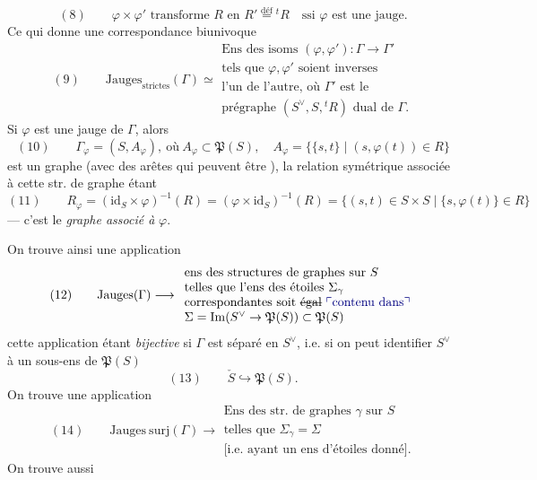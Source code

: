 \documentclass[11pt,a4paper]{article}
\begin{document}
\[
(8) \qquad \varphi \times \varphi' \text{ transforme } R \text{ en } R' \overset{\mathrm{déf}}{=} {}^{t}R \quad \text{ssi } \varphi \text{ est une jauge.}
\]
Ce qui donne une correspondance biunivoque
\[
(9) \qquad \mathrm{Jauges}_{\text{strictes}}(\Gamma) \simeq
\begin{array}{l}
\text{Ens des isoms } (\varphi, \varphi') : \Gamma \to \Gamma' \\
\text{tels que } \varphi, \varphi' \text{ soient inverses} \\
\text{l'un de l'autre, où } \Gamma' \text{ est le} \\
\text{prégraphe } (S^{\vee}, S, {}^{t}R) \text{ dual de } \Gamma .
\end{array}
\]
Si $\varphi$ est une jauge de $\Gamma$, alors
\[
(10) \qquad \Gamma_{\varphi} = (S, A_{\varphi}), \ \text{où}\ A_{\varphi} \subset \mathfrak{P}(S), \quad A_{\varphi} = \{\{s,t\} \mid (s, \varphi(t)) \in R\}
\]
est un graphe (avec des arêtes qui peuvent être ), la relation symétrique associée à cette str. de graphe étant
\[
(11) \qquad R_{\varphi} = (\mathrm{id}_S \times \varphi)^{-1}(R) = (\varphi \times \mathrm{id}_S)^{-1}(R) = \{(s,t) \in S \times S \mid \{s, \varphi(t)\} \in R\}
\]
--- c'est le \emph{graphe associé à} $\varphi$. 

On trouve ainsi une application
\[
(12) \qquad \mathrm{Jauges}(\Gamma) \longrightarrow
\begin{array}{l}
\text{ens des structures de graphes sur } S \\
\text{telles que l'ens des étoiles } \Sigma_{\gamma} \\
\text{correspondantes soit \struck{égal} \add{contenu dans}} \\
\Sigma = \mathrm{Im}(S^{\vee} \to \mathfrak{P}(S)) \subset \mathfrak{P}(S)
\end{array}
\]
cette application étant \emph{bijective} si $\Gamma$ est séparé en $S^{\vee}$, i.e. si on peut identifier $S^{\vee}$ à un sous-ens de $\mathfrak{P}(S)$
\[
(13) \qquad \check{S} \hookrightarrow \mathfrak{P}(S) .
\]
On trouve  une application \ill{}
\[
(14) \qquad \mathrm{Jauges\ surj}(\Gamma) \longrightarrow
\begin{array}{l}
\text{Ens des str. de graphes } \gamma \text{ sur } S \\
\text{telles que } \Sigma_{\gamma} = \Sigma \\
\text{[i.e. ayant un ens d'étoiles donné]} .
\end{array}
\]
On trouve aussi
\end{document}
